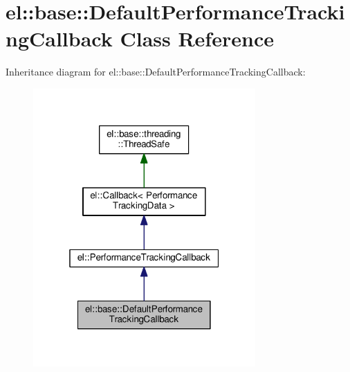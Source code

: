 \hypertarget{classel_1_1base_1_1_default_performance_tracking_callback}{}\section{el\+:\+:base\+:\+:Default\+Performance\+Tracking\+Callback Class Reference}
\label{classel_1_1base_1_1_default_performance_tracking_callback}


Inheritance diagram for el\+:\+:base\+:\+:Default\+Performance\+Tracking\+Callback\+:
\nopagebreak
\begin{figure}[H]
\begin{center}
\leavevmode
\includegraphics[width=241pt]{classel_1_1base_1_1_default_performance_tracking_callback__inherit__graph}
\end{center}
\end{figure}


